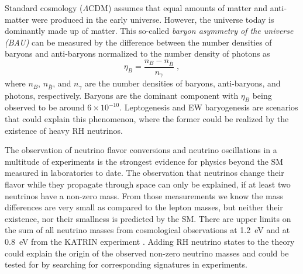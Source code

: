 Standard cosmology ($\Lambda$CDM) assumes that equal amounts of matter and anti-matter were produced in the early universe. However, the universe today is dominantly made up of matter. This so-called \textit{baryon asymmetry of the universe (BAU)} can be measured by the difference between the number densities of baryons and anti-baryons normalized to the number density of photons as
\begin{equation}
    \eta_B = \frac{n_B - n_{\bar{B}}}{n_\gamma}
    \;,
\end{equation}
where $n_B$, $n_{\bar{B}}$, and $n_\gamma$ are the number densities of baryons, anti-baryons, and photons, respectively. Baryons are the dominant component with  $\eta_B$ being observed to be around $6 \times 10^{-10}$. Leptogenesis and EW baryogenesis are scenarios that could explain this phenomenon, where the former could be realized by the existence of heavy RH neutrinos.

The observation of neutrino flavor conversions and neutrino oscillations in a multitude of experiments  is the strongest evidence for physics beyond the SM measured in laboratories to date. The observation that neutrinos change their flavor while they propagate through space can only be explained, if at least two neutrinos have a non-zero mass. From those measurements we know the mass differences are very small as compared to the lepton masses, but neither their existence, nor their smallness is predicted by the SM. There are upper limits on the sum of all neutrino masses from cosmological observations at \SI{1.2}{\electronvolt}  and at \SI{0.8}{\electronvolt} from the KATRIN experiment . Adding RH neutrino states to the theory could explain the origin of the observed non-zero neutrino masses and could be tested for by searching for corresponding signatures in experiments.




